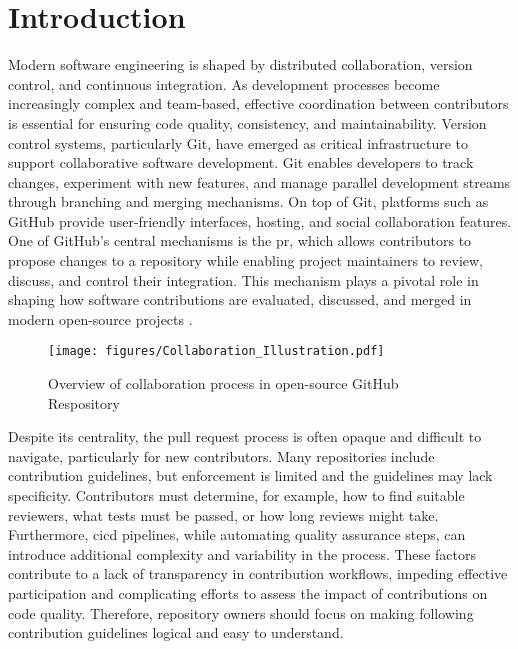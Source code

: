 \chapter{Introduction}
\label{chap:intro}

Modern software engineering is shaped by distributed collaboration, version control, and continuous integration. As development processes become increasingly complex and team-based, effective coordination between contributors is essential for ensuring code quality, consistency, and maintainability. Version control systems, particularly Git, have emerged as critical infrastructure to support collaborative software development. Git enables developers to track changes, experiment with new features, and manage parallel development streams through branching and merging mechanisms. On top of Git, platforms such as GitHub provide user-friendly interfaces, hosting, and social collaboration features. One of GitHub’s central mechanisms is the \ac{pr}, which allows contributors to propose changes to a repository while enabling project maintainers to review, discuss, and control their integration. This mechanism plays a pivotal role in shaping how software contributions are evaluated, discussed, and merged in modern open-source projects \autocite{DBLP:conf/icse/TsayDH14}.

\begin{figure}[htbp]
    \centering
    \texttt{[image: figures/Collaboration\_Illustration.pdf]}
    \caption{Overview of collaboration process in open-source GitHub Respository}
    \label{fig:your-label}
\end{figure}

Despite its centrality, the pull request process is often opaque and difficult to navigate, particularly for new contributors. Many repositories include contribution guidelines, but enforcement is limited and the guidelines may lack specificity. Contributors must determine, for example, how to find suitable reviewers, what tests must be passed, or how long reviews might take. Furthermore, \ac{cicd} pipelines, while automating quality assurance steps, can introduce additional complexity and variability in the process. These factors contribute to a lack of transparency in contribution workflows, impeding effective participation and complicating efforts to assess the impact of contributions on code quality. Therefore, repository owners should focus on making following contribution guidelines logical and easy to understand. 


